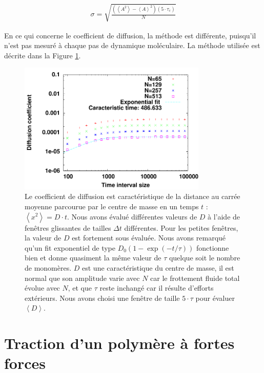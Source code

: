 \documentclass[a4paper,11pt]{article}
\begin{document}
\begin{eqnarray}
\sigma=\sqrt{\frac{\left(\left<A^2 \right>-\left<A \right>^2\right)\left(5 \cdot \tau_c\right)}{N}}
\label{corel2}
\end{eqnarray}

En ce qui concerne le coefficient de diffusion, la méthode est différente, puisqu'il n'est pas mesuré à chaque pas de dynamique moléculaire. La méthode utilisée est décrite dans la Figure \ref{errorbard}.

\begin{figure}[H]
\begin{center}
\includegraphics[width=0.8\textwidth]{dexptime.pdf}

\caption{Le coefficient de diffusion est caractéristique de la distance au carrée moyenne parcourue par le centre de masse en un temps $t$ : $\left<x^2\right> =D\cdot t$. Nous avons évalué différentes valeurs de $D$ à l'aide de fenêtres glissantes de tailles $\Delta t$ différentes. Pour les petites fenêtres, la valeur de $D$ est fortement sous évaluée. Nous avons remarqué qu'un fit exponentiel de type $D_0\left(1-\exp\left(-t/\tau\right)\right)$ fonctionne bien et donne quasiment la même valeur de $\tau$ quelque soit le nombre de monomères. $D$ est une caractéristique du centre de masse, il est normal que son amplitude varie avec $N$ car le frottement fluide total évolue avec $N$, et que $\tau$ reste inchangé car il résulte d’efforts extérieurs. Nous avons choisi une fenêtre de taille $5\cdot \tau$ pour évaluer $\left<D\right> $.}
\label{errorbard}
\end{center}
\end{figure}

\newpage

\section*{Traction d'un polymère à fortes forces}
\end{document}
